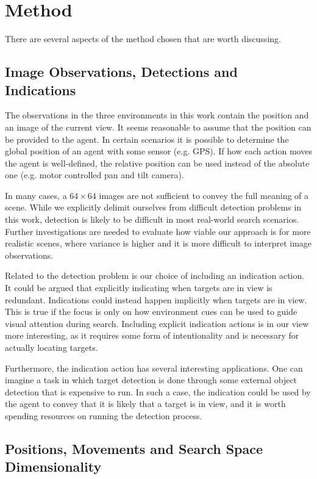\section{Method}
\label{sec:discussion-method}

There are several aspects of the method chosen that are worth discussing.

\subsection{Image Observations, Detections and Indications}

The observations in the three environments in this work contain the position and an image of the current view.
It seems reasonable to assume that the position can be provided to the agent.
In certain scenarios it is possible to determine the global position of an agent with some sensor (e.g. GPS).
If how each action moves the agent is well-defined, the relative position can be used instead of the absolute one (e.g. motor controlled pan and tilt camera).

In many cases, a \(64 \times 64\) images are not sufficient to convey the full meaning of a scene.
While we explicitly delimit ourselves from difficult detection problems in this work,
detection is likely to be difficult in most real-world search scenarios.
Further investigations are needed to evaluate how viable our approach is for more realistic scenes,
where variance is higher and it is more difficult to interpret image observations.

Related to the detection problem is our choice of including an indication action.
It could be argued that explicitly indicating when targets are in view is redundant.
Indications could instead happen implicitly when targets are in view.
This is true if the focus is only on how environment cues can be used to guide visual attention during search.
Including explicit indication actions is in our view more interesting, as it requires some form of intentionality and is necessary for actually locating targets.

Furthermore, the indication action has several interesting applications.
One can imagine a task in which target detection is done through some external object detection that is expensive to run.
In such a case, the indication could be used by the agent to convey that it is likely that a target is in view, and it is worth spending resources on running the detection process.

\subsection{Positions, Movements and Search Space Dimensionality}

